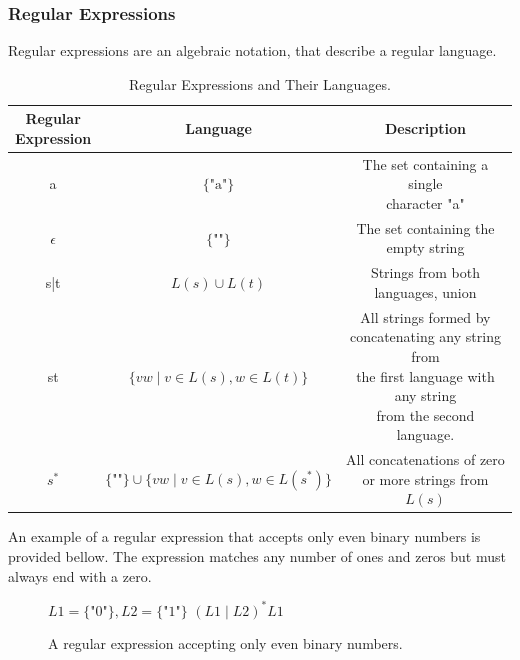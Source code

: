 \subsubsection{Regular Expressions} 

\begin{definition}\label{def:regular_exp}
  Regular expressions are an algebraic notation, that describe a regular language. 
  
\begin{table}[ht]
\centering
\begin{tabular}{|ccc|}
\hline
\makecell{\textbf{Regular}\\ \textbf{Expression}} & \textbf{Language} & \textbf{Description} \\ 
\hline
a                          & $\{\text{"a"}\}$          & \makecell{The set containing a single\\ character "a"} \\
\hline
$\epsilon$                  & $\{\text{""}\}$           & The set containing the empty string \\
\hline
s|t                         & $L(s) \cup L(t)$            & Strings from both languages, union \\
\hline
st                          & $\{vw \mid v \in L(s), w \in L(t)\}$ & \makecell{All strings formed by\\ concatenating any string from\\ the first language with any string\\ from the second language.} \\
\hline
$s^*$                         & $\{\text{""}\} \cup \{vw \mid v \in L(s), w \in L(s^*)\}$ & \makecell{All concatenations of zero \\ or more strings from $L(s)$} \\
\hline
\end{tabular}
\caption{Regular Expressions and Their Languages.}
\label{tab:regex}
\end{table}
\end{definition}

An example of a regular expression that accepts only even binary numbers is provided bellow. The expression matches any number of ones and zeros but must always end with a zero.

\begin{figure}[H]\label{fig:regex}
  \centering
  $L1=\{\text{"}0\text{"}\}, L2=\{\text{"}1\text{"}\}$ $(L1\mid L2)^* L1$
  \caption{A regular expression accepting only even binary numbers.}
\end{figure}


